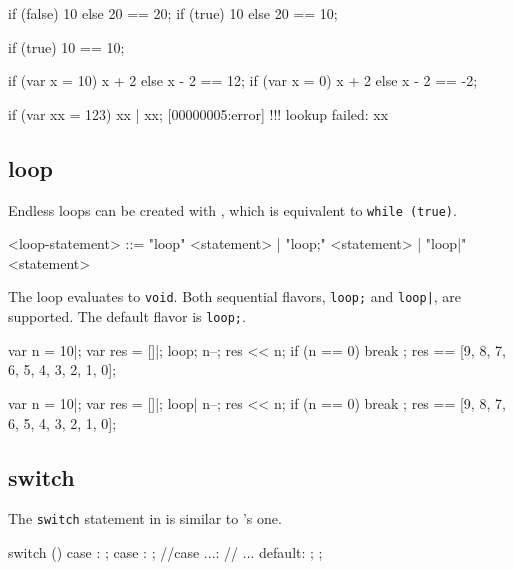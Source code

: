 \begin{urbiassert}
{if (false) 10 else 20} == 20;
{if (true)  10 else 20} == 10;

{if (true) 10         } == 10;

{if (var x = 10) x + 2 else x - 2} == 12;
{if (var x = 0)  x + 2 else x - 2} == -2;

{if (var xx = 123) xx | xx};
[00000005:error] !!! lookup failed: xx
\end{urbiassert}


\subsection{loop}
\label{sec:lang:loop}

Endless loops can be created with , which is equivalent to
\lstinline|while (true)|.

\begin{bnf}
<loop-statement>
  ::= "loop" <statement>
    | "loop;" <statement>
    | "loop|" <statement>
\end{bnf}

The loop evaluates to \lstinline|void|.  Both sequential flavors,
\lstinline|loop;| and \lstinline'loop|', are supported.  The default flavor
is \lstinline|loop;|.

\begin{urbiassert}
{
  var n = 10|;
  var res = []|;
  loop;
  {
    n--;
    res << n;
    if (n == 0)
      break
  };
  res
}
==
[9, 8, 7, 6, 5, 4, 3, 2, 1, 0];
\end{urbiassert}

\begin{urbiassert}
{
  var n = 10|;
  var res = []|;
  loop|
  {
    n--;
    res << n;
    if (n == 0)
      break
  };
  res
}
==
[9, 8, 7, 6, 5, 4, 3, 2, 1, 0];
\end{urbiassert}

\subsection{switch}
\label{sec:lang:switch}
The \lstinline|switch| statement in \us is similar to \C's one.

\begin{urbiunchecked}
switch ()
{
  case :
    ;
  case :
    ;
//case ...:
//  ...
  default:
    ;
};
\end{urbiunchecked}

